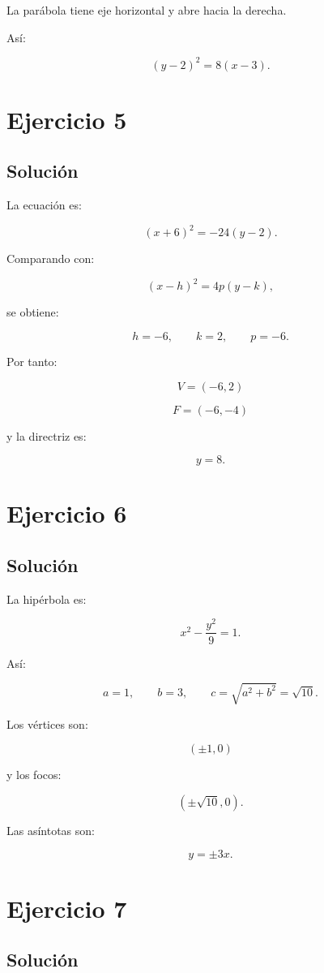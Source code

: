 \documentclass[11pt,a4paper]{article}
\begin{document}
La parábola tiene eje horizontal y abre hacia la derecha.

Así:

\[
\boxed{
(y-2)^2=8(x-3).
}
\]

\section{Ejercicio 5}
\subsection{Solución}

La ecuación es:

\[
(x+6)^2=-24(y-2).
\]

Comparando con:

\[
(x-h)^2=4p(y-k),
\]

se obtiene:

\[
h=-6,
\qquad
k=2,
\qquad
p=-6.
\]

Por tanto:

\[
\boxed{
V=(-6,2)
}
\]

\[
\boxed{
F=(-6,-4)
}
\]

y la directriz es:

\[
\boxed{
y=8.
}
\]

\section{Ejercicio 6}
\subsection{Solución}

La hipérbola es:

\[
x^2-\frac{y^2}{9}=1.
\]

Así:

\[
a=1,
\qquad
b=3,
\qquad
c=\sqrt{a^2+b^2}=\sqrt{10}.
\]

Los vértices son:

\[
\boxed{
(\pm1,0)
}
\]

y los focos:

\[
\boxed{
(\pm\sqrt{10},0).
}
\]

Las asíntotas son:

\[
\boxed{
y=\pm3x.
}
\]

\section{Ejercicio 7}
\subsection{Solución}
\end{document}
